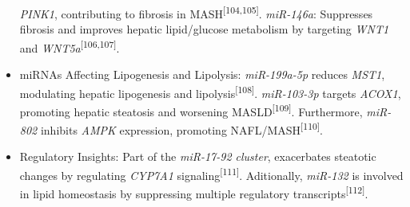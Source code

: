 \documentclass[
  11pt,
  letterpaper,
]{book}
\begin{document}
\begin{itemize}
  \emph{PINK1}, contributing to fibrosis in
  MASH\textsuperscript{{[}104,105{]}}. \emph{miR-146a}: Suppresses
  fibrosis and improves hepatic lipid/glucose metabolism by targeting
  \emph{WNT1} and \emph{WNT5a}\textsuperscript{{[}106,107{]}}.
\item
  miRNAs Affecting Lipogenesis and Lipolysis: \emph{miR-199a-5p} reduces
  \emph{MST1}, modulating hepatic lipogenesis and
  lipolysis\textsuperscript{{[}108{]}}. \emph{miR-103-3p} targets
  \emph{ACOX1}, promoting hepatic steatosis and worsening
  MASLD\textsuperscript{{[}109{]}}. Furthermore, \emph{miR-802} inhibits
  \emph{AMPK} expression, promoting
  NAFL/MASH\textsuperscript{{[}110{]}}.
\item
  Regulatory Insights: Part of the \emph{miR-17-92 cluster}, exacerbates
  steatotic changes by regulating \emph{CYP7A1}
  signaling\textsuperscript{{[}111{]}}. Aditionally, \emph{miR-132} is
  involved in lipid homeostasis by suppressing multiple regulatory
  transcripts\textsuperscript{{[}112{]}}.
\end{itemize}
\end{document}
